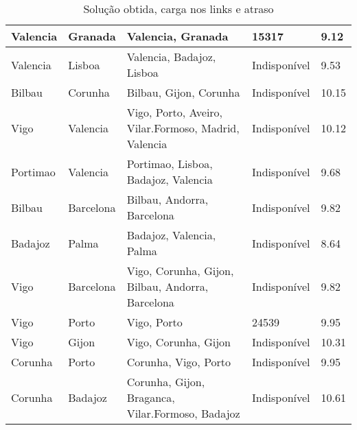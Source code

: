 \begin{table}[!htb]
{\begin{tabular}{|l|l|l|l|l|}
Valencia & Granada & Valencia, Granada & 15317 & 9.12 \\ \hline
Valencia & Lisboa & Valencia, Badajoz, Lisboa & Indisponível & 9.53 \\ \hline
Bilbau & Corunha & Bilbau, Gijon, Corunha & Indisponível & 10.15 \\ \hline
Vigo & Valencia & Vigo, Porto, Aveiro, Vilar.Formoso, Madrid, Valencia & Indisponível & 10.12 \\ \hline
Portimao & Valencia & Portimao, Lisboa, Badajoz, Valencia & Indisponível & 9.68 \\ \hline
Bilbau & Barcelona & Bilbau, Andorra, Barcelona & Indisponível & 9.82 \\ \hline
Badajoz & Palma & Badajoz, Valencia, Palma & Indisponível & 8.64 \\ \hline
Vigo & Barcelona & Vigo, Corunha, Gijon, Bilbau, Andorra, Barcelona & Indisponível & 9.82 \\ \hline
Vigo & Porto & Vigo, Porto & 24539 & 9.95 \\ \hline
Vigo & Gijon & Vigo, Corunha, Gijon & Indisponível & 10.31 \\ \hline
Corunha & Porto & Corunha, Vigo, Porto & Indisponível & 9.95 \\ \hline
Corunha & Badajoz & Corunha, Gijon, Braganca, Vilar.Formoso, Badajoz & Indisponível & 10.61 \\ \hline
\end{tabular}}
\caption[]{Solução obtida, carga nos links e atraso}
\end{table}

